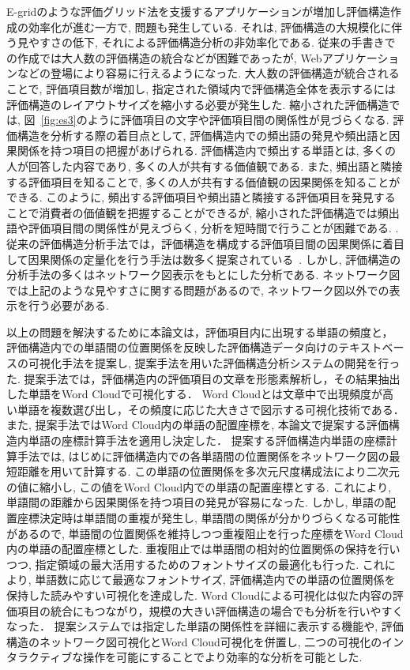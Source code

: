 \documentclass[syuuron]{kuee}
\begin{document}
	E-gridのような評価グリッド法を支援するアプリケーションが増加し評価構造作成の効率化が進む一方で, 問題も発生している. 
	それは, 評価構造の大規模化に伴う見やすさの低下, それによる評価構造分析の非効率化である. 
	従来の手書きでの作成では大人数の評価構造の統合などが困難であったが, Webアプリケーションなどの登場により容易に行えるようになった. 
	大人数の評価構造が統合されることで, 評価項目数が増加し, 指定された領域内で評価構造全体を表示するには評価構造のレイアウトサイズを縮小する必要が発生した.  
	縮小された評価構造では, 図~\ref{fig:es3}のように評価項目の文字や評価項目間の関係性が見づらくなる. 
	評価構造を分析する際の着目点として, 評価構造内での頻出語の発見や頻出語と因果関係を持つ項目の把握があげられる. 
	評価構造内で頻出する単語とは, 多くの人が回答した内容であり, 多くの人が共有する価値観である. 
	また, 頻出語と隣接する評価項目を知ることで, 多くの人が共有する価値観の因果関係を知ることができる. 
	このように, 頻出する評価項目や頻出語と隣接する評価項目を発見することで消費者の価値観を把握することができるが, 
	縮小された評価構造では頻出語や評価項目間の関係性が見えづらく, 分析を短時間で行うことが困難である. 	. 
	従来の評価構造分析手法では，評価構造を構成する評価項目間の因果関係に着目して因果関係の定量化を行う手法は数多く提案されている~\cite{egm8, egm9}. 
	しかし, 評価構造の分析手法の多くはネットワーク図表示をもとにした分析である. 
	ネットワーク図では上記のような見やすさに関する問題があるので, ネットワーク図以外での表示を行う必要がある. 
	
	以上の問題を解決するために本論文は，評価項目内に出現する単語の頻度と，
	評価構造内での単語間の位置関係を反映した評価構造データ向けのテキストベースの可視化手法を提案し, 
	提案手法を用いた評価構造分析システムの開発を行った. 
	提案手法では，評価構造内の評価項目の文章を形態素解析し，その結果抽出した単語をWord Cloudで可視化する．
	Word Cloudとは文章中で出現頻度が高い単語を複数選び出し，その頻度に応じた大きさで図示する可視化技術である．
	また, 提案手法ではWord Cloud内の単語の配置座標を, 本論文で提案する評価構造内単語の座標計算手法を適用し決定した．
	提案する評価構造内単語の座標計算手法では, はじめに評価構造内での各単語間の位置関係をネットワーク図の最短距離を用いて計算する. 
	この単語の位置関係を多次元尺度構成法により二次元の値に縮小し, この値をWord Cloud内での単語の配置座標とする. 
	これにより, 単語間の距離から因果関係を持つ項目の発見が容易になった. 
	しかし, 単語の配置座標決定時は単語間の重複が発生し, 単語間の関係が分かりづらくなる可能性があるので, 
	単語間の位置関係を維持しつつ重複阻止を行った座標をWord Cloud内の単語の配置座標とした. 
	重複阻止では単語間の相対的位置関係の保持を行いつつ, 指定領域の最大活用するためのフォントサイズの最適化も行った. 
	これにより, 単語数に応じて最適なフォントサイズ, 評価構造内での単語の位置関係を保持した読みやすい可視化を達成した. 
	Word Cloudによる可視化は似た内容の評価項目の統合にもつながり，規模の大きい評価構造の場合でも分析を行いやすくなった．
	提案システムでは指定した単語の関係性を詳細に表示する機能や, 評価構造のネットワーク図可視化とWord Cloud可視化を併置し, 
	二つの可視化のインタラクティブな操作を可能にすることでより効率的な分析を可能とした. 
\end{document}
